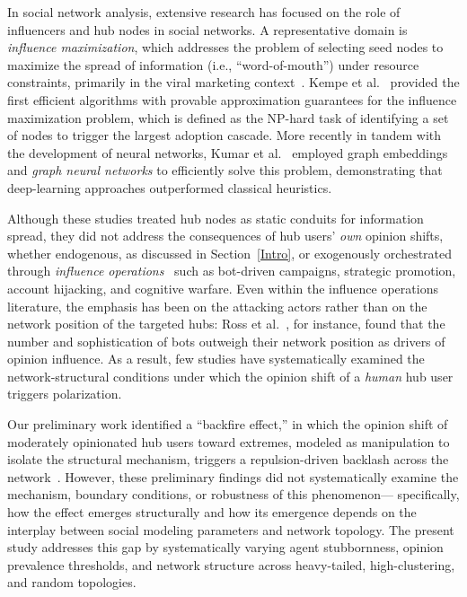 \documentclass[pdflatex,sn-mathphys-num]{sn-jnl}%
\theoremstyle{thmstyleone}%
\theoremstyle{thmstyletwo}%
\theoremstyle{thmstylethree}%
\begin{document}
In social network analysis, extensive research has
focused on the role of influencers and hub nodes in social networks. A
representative domain is \emph{influence maximization}, which
addresses the problem of selecting seed nodes to maximize the spread
of information (i.e., ``word-of-mouth'') under resource constraints,
primarily in the viral marketing context~\cite{Kempe2003,Kitsak2010,Budak2011,Kumar2022}.
Kempe et al.~\cite{Kempe2003} provided the first efficient algorithms with
provable approximation guarantees for the influence maximization
problem, which is defined as the NP-hard task of identifying a set of nodes to
trigger the largest adoption cascade. More recently in tandem with the development of neural networks, Kumar et
al.~\cite{Kumar2022} employed graph embeddings and {\em graph neural networks} to efficiently solve this problem, demonstrating that deep-learning approaches outperformed classical heuristics.
\par



Although these studies treated hub nodes as static conduits for information spread,
they did not address the consequences of hub users' \emph{own} opinion shifts, whether
endogenous, as discussed in Section~\ref{Intro}, or exogenously orchestrated through
\emph{influence operations}~\cite{Beskow2019,Ross2019,Bergh2020,Goldstein2023} such
as bot-driven campaigns, strategic promotion, account hijacking, and cognitive warfare.
Even within the influence operations literature, the emphasis has been on the
attacking actors rather than on the network position of the targeted hubs:
Ross et al.~\cite{Ross2019}, for instance, found that the number and sophistication
of bots outweigh their network position as drivers of opinion influence.
As a result, few studies have systematically examined the network-structural
conditions under which the opinion shift of a \emph{human} hub user
triggers polarization.

Our preliminary work identified a ``backfire effect,'' in which the opinion
shift of moderately opinionated hub users toward extremes, modeled as manipulation to
isolate the structural mechanism, triggers a repulsion-driven backlash across
the network~\cite{Takeda2026}.
However, these preliminary findings did not systematically
examine the mechanism, boundary conditions, or robustness of this phenomenon---
specifically, how the effect emerges structurally and
how its emergence depends on the
interplay between social modeling parameters and network topology.
The present study addresses this gap by systematically varying agent stubbornness,
opinion prevalence thresholds, and network structure across heavy-tailed,
high-clustering, and random topologies.
\par
\end{document}
